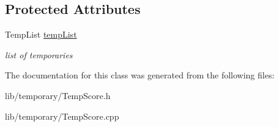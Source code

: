 \subsection*{\-Protected \-Attributes}
\begin{DoxyCompactItemize}
\item 
\hypertarget{classsinsy_1_1TempScore_a990ea698c07d1a233466dc380c4e37d7}{\-Temp\-List \hyperlink{classsinsy_1_1TempScore_a990ea698c07d1a233466dc380c4e37d7}{temp\-List}}\label{classsinsy_1_1TempScore_a990ea698c07d1a233466dc380c4e37d7}

\begin{DoxyCompactList}\small\item\em list of temporaries \end{DoxyCompactList}\end{DoxyCompactItemize}


\-The documentation for this class was generated from the following files\-:\begin{DoxyCompactItemize}
\item 
lib/temporary/\-Temp\-Score.\-h\item 
lib/temporary/\-Temp\-Score.\-cpp\end{DoxyCompactItemize}
